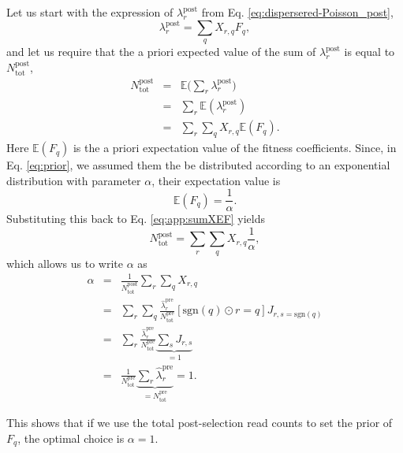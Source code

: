 \documentclass[letter,10pt,oneside]{article}
\newcommand{\be}{\begin{equation*}}
\newcommand{\ee}{\end{equation*}}
\newcommand{\bal}{\begin{eqnarray}}
\newcommand{\eal}{\end{eqnarray}}
\newcommand{\ba}{\begin{eqnarray*}}
\newcommand{\ea}{\end{eqnarray*}}
\newcommand{\+}{^\dagger}
\newcommand{\refeq}[1]{Eq. \ref{#1}}
\begin{document}
\begin{appendix}
Let us start with the expression of $\lambda_r^\text{post}$ from \refeq{eq:dispersered-Poisson_post},
\be
  \lambda_r^\text{post} = \sum_q X_{r,q} F_q,
\ee
and let us require that the a priori expected value of the sum of $\lambda_r^\text{post}$ is equal to $N_\text{tot}^\text{post}$,
\bal
  N_\text{tot}^\text{post} 
  &=& \mathbb{E}\Big(\sum_r \lambda_r^\text{post}\Big)
  \nonumber\\
  &=& \sum_r  \mathbb{E}(\lambda_r^\text{post})
  \nonumber\\
  \label{eq:app:sumXEF}
  &=& \sum_r \sum_q X_{r,q} \mathbb{E}(F_q).
\eal
Here $\mathbb{E}(F_q)$ is the a priori expectation value of the fitness coefficients. Since, in \refeq{eq:prior}, we assumed them the be distributed according to an exponential distribution with parameter $\alpha$, their expectation value is
\be
  \mathbb{E}(F_q) = \frac{1}{\alpha}.
\ee
Substituting this back to \refeq{eq:app:sumXEF} yields
\be
  N_\text{tot}^\text{post}  = \sum_r \sum_q X_{r,q} \frac{1}{\alpha},
\ee
which allows us to write $\alpha$ as
\ba
  \alpha 
  &=& \frac{1}{N_\text{tot}^\text{post}} \sum_r \sum_q X_{r,q} 
  \\
  &=& \sum_r \sum_q \frac{\hat \lambda_r^\text{pre}}{N_\text{tot}^\text{pre}} [\text{sgn}(q)\odot r = q] J_{r, s=\text{sgn}(q)} 
  \\
  &=& \sum_r \frac{\hat \lambda_r^\text{pre}}{N_\text{tot}^\text{pre}} \underbrace{\sum_s J_{r,s}}_{=1}
  \\
  &=& \frac{1}{N_\text{tot}^\text{pre}} \underbrace{\sum_r \hat \lambda_r^\text{pre}}_{=N_\text{tot}^\text{pre}} = 1.
\ea

This shows that if we use the total post-selection read counts to set the prior of $F_q$, the optimal choice is $\alpha = 1$.


\end{appendix}
\end{document}
